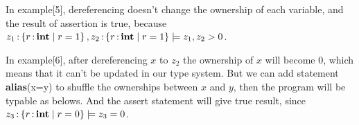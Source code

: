 \documentclass[runningheads]{llncs}
\begin{document}
In example[5], dereferencing doesn't change the ownership of each variable, and the result
of assertion is true, because $z_1 \operatorname{:} \left\{{r \operatorname{:} \mathbf{int} \mid r = 1}\right\},z_2 \operatorname{:} \left\{{r \operatorname{:} \mathbf{int} \mid r = 1}\right\}\models z_1, z_2>0$.

\begin{parcolumns}{2}
\colplacechunks
\end{parcolumns}

In example[6], after dereferencing $x$ to $z_2$ the ownership of $x$ will become 0, which means that
it can't be updated in our type system. But we can add statement \textbf{alias}(x=y)
to shuffle the ownerships between $x$ and $y$, then the program will be typable as belows. And the assert
statement will give true result, since $z_3 \operatorname{:} \left\{{r \operatorname{:} \mathbf{int} \mid r = 0}\right\}\models z_3 = 0$.
\end{document}
